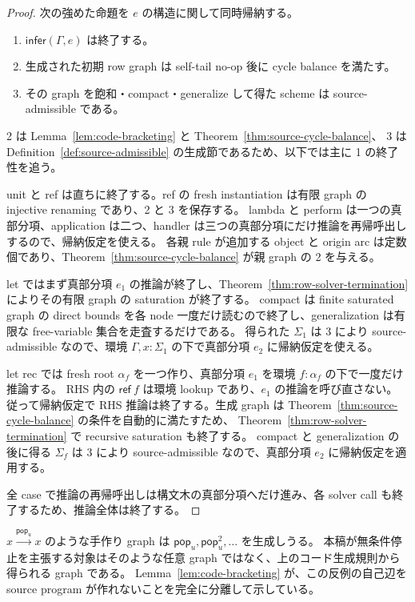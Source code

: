 \documentclass[uplatex,dvipdfmx,a4paper,10.5pt]{jsarticle}
\theoremstyle{jpplain}
\newcommand{\popop}[1]{\mathsf{pop}_{#1}}
\newcommand{\kw}[1]{\mathsf{#1}}
\begin{document}
\begin{proof}
次の強めた命題を $e$ の構造に関して同時帰納する。
\begin{enumerate}
  \item $\mathsf{infer}(\Gamma,e)$ は終了する。
  \item 生成された初期 row graph は self-tail no-op 後に cycle balance を満たす。
  \item その graph を飽和・compact・generalize して得た scheme は source-admissible である。
\end{enumerate}
2 は Lemma~\ref{lem:code-bracketing} と Theorem~\ref{thm:source-cycle-balance}、
3 は Definition~\ref{def:source-admissible} の生成節であるため、以下では主に 1 の終了性を追う。

unit と ref は直ちに終了する。ref の fresh instantiation は有限 graph の injective renaming であり、2 と 3 を保存する。
lambda と perform は一つの真部分項、application は二つ、handler は三つの真部分項にだけ推論を再帰呼出しするので、帰納仮定を使える。
各親 rule が追加する object と origin arc は定数個であり、Theorem~\ref{thm:source-cycle-balance} が親 graph の 2 を与える。

let ではまず真部分項 $e_1$ の推論が終了し、Theorem~\ref{thm:row-solver-termination} によりその有限 graph の saturation が終了する。
compact は finite saturated graph の direct bounds を各 node 一度だけ読むので終了し、generalization は有限な free-variable 集合を走査するだけである。
得られた $\Sigma_1$ は 3 により source-admissible なので、環境 $\Gamma,x:\Sigma_1$ の下で真部分項 $e_2$ に帰納仮定を使える。

let rec では fresh root $\alpha_f$ を一つ作り、真部分項 $e_1$ を環境 $f:\alpha_f$ の下で一度だけ推論する。
RHS 内の $\kw{ref}\ f$ は環境 lookup であり、$e_1$ の推論を呼び直さない。
従って帰納仮定で RHS 推論は終了する。生成 graph は Theorem~\ref{thm:source-cycle-balance} の条件を自動的に満たすため、
Theorem~\ref{thm:row-solver-termination} で recursive saturation も終了する。
compact と generalization の後に得る $\Sigma_f$ は 3 により source-admissible なので、真部分項 $e_2$ に帰納仮定を適用する。

全 case で推論の再帰呼出しは構文木の真部分項へだけ進み、各 solver call も終了するため、推論全体は終了する。
\end{proof}

\begin{notebox}[title={任意 graph の反例との違い}]
$x\xrightarrow{\popop{u}}x$ のような手作り graph は $\popop{u},\popop{u}^2,\ldots$ を生成しうる。
本稿が無条件停止を主張する対象はそのような任意 graph ではなく、上のコード生成規則から得られる graph である。
Lemma~\ref{lem:code-bracketing} が、この反例の自己辺を source program が作れないことを完全に分離して示している。
\end{notebox}
\end{document}
